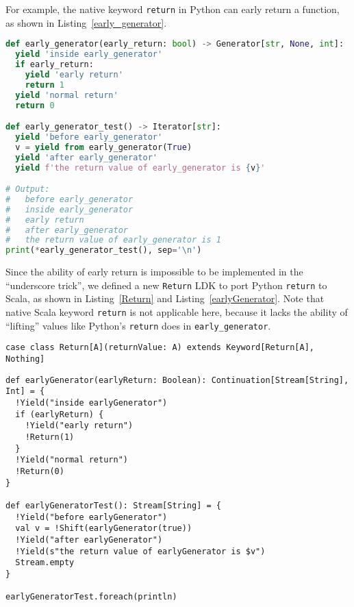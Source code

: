For example, the native keyword \lstinline{return} in Python can early return a function, as shown in Listing~\ref{early_generator}.

\begin{lstlisting}[language=Python,style=Python3,caption={Use \lstinline{yield from} and \lstinline{return} in Python generators},label={early_generator}]
def early_generator(early_return: bool) -> Generator[str, None, int]:
  yield 'inside early_generator'
  if early_return:
    yield 'early return'
    return 1
  yield 'normal return'
  return 0

def early_generator_test() -> Iterator[str]:
  yield 'before early_generator'
  v = yield from early_generator(True)
  yield 'after early_generator'
  yield f'the return value of early_generator is {v}'

# Output:
#   before early_generator
#   inside early_generator
#   early return
#   after early_generator
#   the return value of early_generator is 1
print(*early_generator_test(), sep='\n')
\end{lstlisting}

Since the ability of early return is impossible to be implemented in the ``underscore trick'', we defined a new \lstinline{Return} LDK to port Python \lstinline{return} to Scala, as shown in Listing~\ref{Return} and Listing~\ref{earlyGenerator}. Note that native Scala keyword \lstinline{return} is not applicable here, because it lacks the ability of ``lifting'' values like Python's \lstinline{return} does in \lstinline{early_generator}.

\begin{lstlisting}[caption={The definition of \lstinline{Return} LDK},label={Return}]
case class Return[A](returnValue: A) extends Keyword[Return[A], Nothing]
\end{lstlisting}

\begin{lstlisting}[caption={Use \lstinline{Shift} and \lstinline{Return} in LDK-based generators},label={earlyGenerator}]
def earlyGenerator(earlyReturn: Boolean): Continuation[Stream[String], Int] = {
  !Yield("inside earlyGenerator")
  if (earlyReturn) {
    !Yield("early return")
    !Return(1)
  }
  !Yield("normal return")
  !Return(0)
}

def earlyGeneratorTest(): Stream[String] = {
  !Yield("before earlyGenerator")
  val v = !Shift(earlyGenerator(true))
  !Yield("after earlyGenerator")
  !Yield(s"the return value of earlyGenerator is $v")
  Stream.empty
}

earlyGeneratorTest.foreach(println)
\end{lstlisting}

